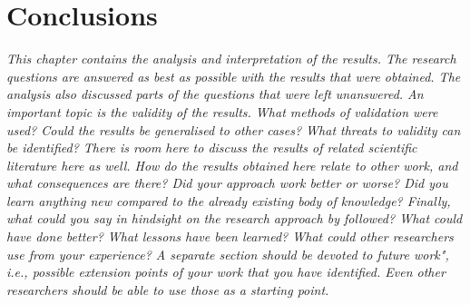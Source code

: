 \chapter{Conclusions}
\emph{This chapter contains the analysis and interpretation of the results.
The research questions are answered as best as possible with the results that were obtained.
The analysis also discussed parts of the questions that were left unanswered.
An important topic is the validity of the results. What methods of validation were used? Could
the results be generalised to other cases? What threats to validity can be identified? There is
room here to discuss the results of related scientific literature here as well. How do the results
obtained here relate to other work, and what consequences are there? Did your approach
work better or worse? Did you learn anything new compared to the already existing body of
knowledge? Finally, what could you say in hindsight on the research approach by followed?
What could have done better? What lessons have been learned? What could other researchers
use from your experience? A separate section should be devoted to future work", i.e., possible
extension points of your work that you have identified. Even other researchers should be able
to use those as a starting point.}

